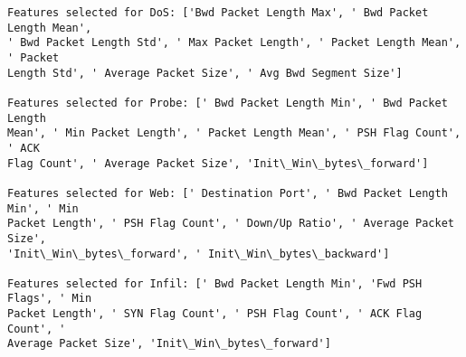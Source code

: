 \documentclass[11pt]{article}
\begin{document}
    \begin{Verbatim}[commandchars=\\\{\}]
Features selected for DoS: ['Bwd Packet Length Max', ' Bwd Packet Length Mean',
' Bwd Packet Length Std', ' Max Packet Length', ' Packet Length Mean', ' Packet
Length Std', ' Average Packet Size', ' Avg Bwd Segment Size']

Features selected for Probe: [' Bwd Packet Length Min', ' Bwd Packet Length
Mean', ' Min Packet Length', ' Packet Length Mean', ' PSH Flag Count', ' ACK
Flag Count', ' Average Packet Size', 'Init\_Win\_bytes\_forward']

Features selected for Web: [' Destination Port', ' Bwd Packet Length Min', ' Min
Packet Length', ' PSH Flag Count', ' Down/Up Ratio', ' Average Packet Size',
'Init\_Win\_bytes\_forward', ' Init\_Win\_bytes\_backward']

Features selected for Infil: [' Bwd Packet Length Min', 'Fwd PSH Flags', ' Min
Packet Length', ' SYN Flag Count', ' PSH Flag Count', ' ACK Flag Count', '
Average Packet Size', 'Init\_Win\_bytes\_forward']
    \end{Verbatim}
\end{document}
